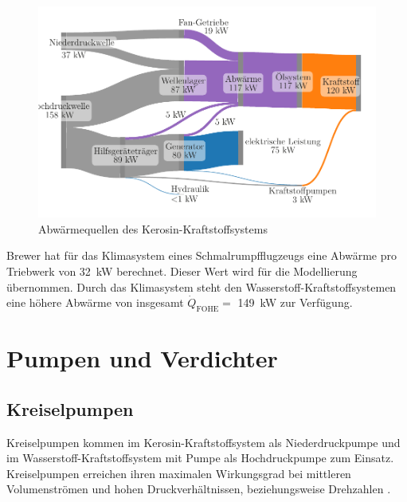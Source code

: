 \begin{figure}[ht]
	\centering
	\includegraphics[width=1\linewidth]{4_Abbildungen/2_Hauptteil/sankey.pdf}
	\caption{Abwärmequellen des Kerosin-Kraftstoffsystems}
	\label{fig:sankey}
\end{figure}
\FloatBarrier 


Brewer \cite{Brewer.1991} hat für das Klimasystem eines Schmalrumpfflugzeugs eine Abwärme pro Triebwerk von \SI{32}{\kilo\W} berechnet. Dieser Wert wird für die Modellierung übernommen. Durch das Klimasystem steht den Wasserstoff-Kraftstoffsystemen eine höhere Abwärme von insgesamt $\dot{Q}_{\mathrm{FOHE}}=$ \SI{149}{\kilo\W} zur Verfügung.

\section{Pumpen und Verdichter}

\subsection{Kreiselpumpen}

Kreiselpumpen kommen im Kerosin-Kraftstoffsystem als Niederdruckpumpe und im Wasserstoff-Kraftstoffsystem mit Pumpe als Hochdruckpumpe zum Einsatz. Kreiselpumpen erreichen ihren maximalen Wirkungsgrad bei mittleren Volumenströmen und hohen Druckverhältnissen, beziehungsweise Drehzahlen \cite{Gulich.2013}. %


